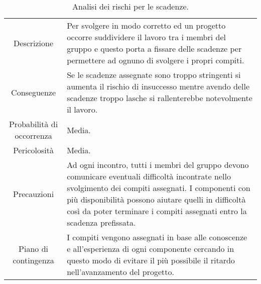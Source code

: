 \begin{table}[H]
	\begin{tabular}{|c|p{11.5cm}|}
		\rowcolor{darkblue} \hline
		\multicolumn{2}{|c|}{\textcolor{white}{\textbf{RO2 - Scadenze}}}\\ \hline
		Descrizione & Per svolgere in modo corretto ed \glo{efficiente} un progetto occorre suddividere il lavoro tra i membri del gruppo e questo porta a fissare delle scadenze per permettere ad ognuno di svolgere i propri compiti.\\ \hline
		Conseguenze & Se le scadenze assegnate sono troppo stringenti si aumenta il rischio di insuccesso mentre avendo delle scadenze troppo lasche si rallenterebbe notevolmente il lavoro.\\ \hline
		Probabilità di occorrenza & Media.\\ \hline
		Pericolosità & Media.\\ \hline
		Precauzioni & Ad ogni incontro, tutti i membri del gruppo devono comunicare eventuali difficoltà incontrate nello svolgimento dei compiti assegnati. I componenti con più disponibilità possono aiutare quelli in difficoltà così da poter terminare i compiti assegnati entro la scadenza prefissata.\\ \hline
		Piano di contingenza & I compiti vengono assegnati in base alle conoscenze e all'esperienza di ogni componente cercando in questo modo di evitare il più possibile il ritardo nell'avanzamento del progetto.\\ \hline
	\end{tabular}
	\caption{\label{tab:RO2}Analisi dei rischi per le scadenze.}
\end{table}


